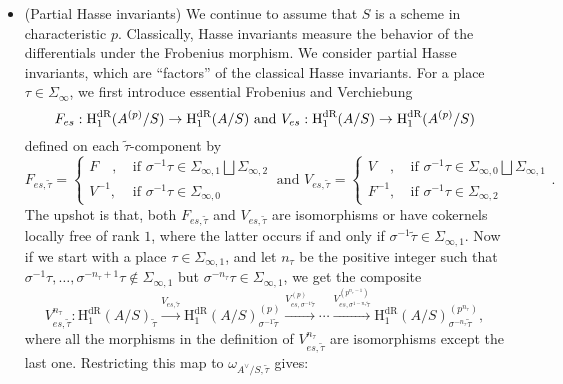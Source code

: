 \documentclass{article}
\begin{document}
\begin{itemize}
	\item (Partial Hasse invariants) We continue to assume that $S$ is a scheme in characteristic $p$. Classically, Hasse invariants measure the behavior of the differentials under the Frobenius morphism. We consider partial Hasse invariants, which are ``factors'' of the classical Hasse invariants. For a place $\tau\in \Sigma_{\infty}$, we first introduce essential Frobenius and Verchiebung
\begin{equation}
F_{es}:\textnormal{H}_1^{\textnormal{dR}}(A^{(p)}/S)\to \textnormal{H}_1^{\textnormal{dR}}(A/S)\ \textnormal{and}\ V_{es}:\textnormal{H}_1^{\textnormal{dR}}(A/S)\to \textnormal{H}_1^{\textnormal{dR}}(A^{(p)}/S)
\end{equation}
defined on each $\tilde\tau$-component by
\begin{equation}
	F_{es,\tilde\tau}=\left\{
\begin{aligned}
F\quad  ,\ &\text{if } \sigma^{-1}\tau\in \Sigma_{\infty,1}\bigsqcup \Sigma_{\infty,2}  \\
V^{-1},\ &\text{if } \sigma^{-1}\tau\in \Sigma_{\infty,0}
\end{aligned}\right.
\ \text{and } V_{es,\tilde\tau}=\left\{
\begin{aligned}
V\quad,\ &\text{if }  \sigma^{-1}\tau\in \Sigma_{\infty,0}\bigsqcup\Sigma_{\infty,1}\\
F^{-1},\ &\text{if }  \sigma^{-1}\tau\in \Sigma_{\infty,2}
\end{aligned}\right..
\end{equation}
The upshot is that, both $F_{es,\tilde\tau}$ and $V_{es,\tilde\tau}$ are isomorphisms or have cokernels locally free of rank $1$, where the latter occurs if and only if $\sigma^{-1}\tilde\tau\in \Sigma_{\infty,1}$. Now if we start with a place $\tau\in\Sigma_{\infty,1}$, and let $n_\tau$ be the positive integer such that $\sigma^{-1}\tau,\ldots,\sigma^{-n_\tau+1}\tau\notin \Sigma_{\infty,1}$ but $\sigma^{-n_\tau}\tau\in \Sigma_{\infty,1}$, we get the composite
		\begin{equation}
			V_{es,\tilde\tau}^{n_\tau}:\text{H}^{\text{dR}}_1(A/S)_{\tilde\tau}\xrightarrow{V_{es,\tilde\tau}}\text{H}^{\text{dR}}_1(A/S)^{(p)}_{\sigma^{-1}\tilde\tau}\xrightarrow{V^{(p)}_{es,\sigma^{-1}\tilde\tau}}\cdots\xrightarrow{V_{es,\sigma^{1-n_\tau}\tilde\tau}^{(p^{n_\tau-1})}}\text{H}^{\text{dR}}_1(A/S)^{(p^{n_\tau})}_{\sigma^{-n_\tau}\tilde\tau},
		\end{equation}
where all the morphisms in the definition of $V^{n_\tau}_{es,\tilde\tau}$ are isomorphisms except the last one. Restricting this map to $\omega_{A^\vee/S,\tilde\tau}$ gives:

\end{itemize}
\end{document}
